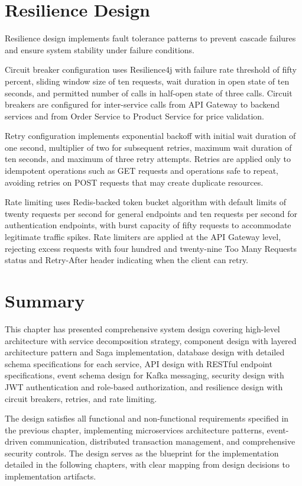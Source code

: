 \section{Resilience Design}

Resilience design implements fault tolerance patterns to prevent cascade failures and ensure system stability under failure conditions.

Circuit breaker configuration uses Resilience4j with failure rate threshold of fifty percent, sliding window size of ten requests, wait duration in open state of ten seconds, and permitted number of calls in half-open state of three calls. Circuit breakers are configured for inter-service calls from API Gateway to backend services and from Order Service to Product Service for price validation.

Retry configuration implements exponential backoff with initial wait duration of one second, multiplier of two for subsequent retries, maximum wait duration of ten seconds, and maximum of three retry attempts. Retries are applied only to idempotent operations such as GET requests and operations safe to repeat, avoiding retries on POST requests that may create duplicate resources.

Rate limiting uses Redis-backed token bucket algorithm with default limits of twenty requests per second for general endpoints and ten requests per second for authentication endpoints, with burst capacity of fifty requests to accommodate legitimate traffic spikes. Rate limiters are applied at the API Gateway level, rejecting excess requests with four hundred and twenty-nine Too Many Requests status and Retry-After header indicating when the client can retry.

\section{Summary}

This chapter has presented comprehensive system design covering high-level architecture with service decomposition strategy, component design with layered architecture pattern and Saga implementation, database design with detailed schema specifications for each service, API design with RESTful endpoint specifications, event schema design for Kafka messaging, security design with JWT authentication and role-based authorization, and resilience design with circuit breakers, retries, and rate limiting.

The design satisfies all functional and non-functional requirements specified in the previous chapter, implementing microservices architecture patterns, event-driven communication, distributed transaction management, and comprehensive security controls. The design serves as the blueprint for the implementation detailed in the following chapters, with clear mapping from design decisions to implementation artifacts.
